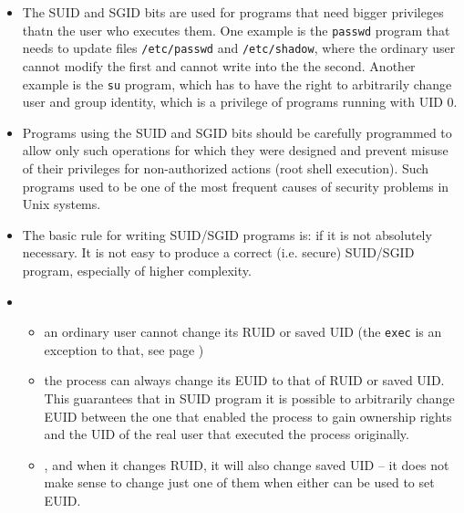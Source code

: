 \begin{itemize}
\item \label{SUID_BIT} The SUID and SGID bits are used for programs that need
bigger privileges thatn the user who executes them. One example is the
\texttt{passwd} program that needs to update files \texttt{/etc/passwd} and
\texttt{/etc/shadow}, where the ordinary user cannot modify the first and
cannot write into the the second. Another example is the \texttt{su} program,
which has to have the right to arbitrarily change user and group identity,
which is a privilege of programs running with UID 0.
\item Programs using the SUID and SGID bits should be carefully programmed
to allow only such operations for which they were designed and prevent misuse
of their privileges for non-authorized actions (root shell execution).
Such programs used to be one of the most frequent causes of security problems
in Unix systems.
\item The basic rule for writing SUID/SGID programs is:  if it is not absolutely necessary.  It is not easy to produce a correct
(i.e. secure) SUID/SGID program, especially of higher complexity.
\item {}
\begin{itemize}
\item an ordinary user cannot change its RUID or saved UID (the \texttt{exec} is
an exception to that, see page \pageref{EXEC})
\item the process can always change its EUID to that of RUID or saved UID.
This guarantees that in SUID program it is possible to arbitrarily change EUID
between the one that enabled the process to gain ownership rights and the
UID of the real user that executed the process originally.
\item {}, and when it changes RUID, it will also
change saved UID -- it does not make sense to change just one of them when
either can be used to set EUID.
\end{itemize}
\end{itemize}



